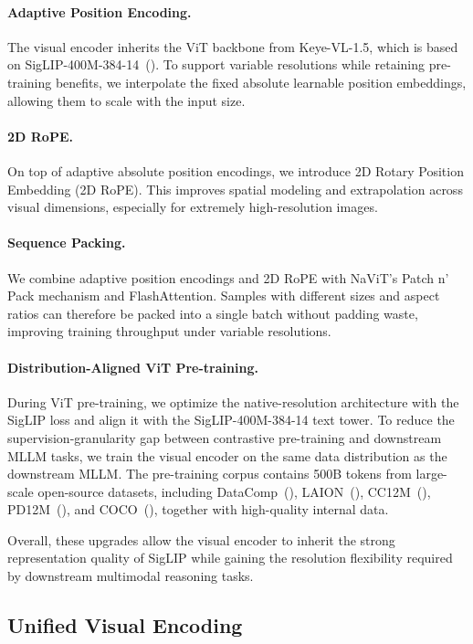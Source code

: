 \documentclass{llmxive}
\begin{document}
\paragraph{Adaptive Position Encoding.}
The visual encoder inherits the ViT backbone from Keye-VL-1.5, which is based on SigLIP-400M-384-14~(\cite{siglip}). To support variable resolutions while retaining pre-training benefits, we interpolate the fixed absolute learnable position embeddings, allowing them to scale with the input size.

\paragraph{2D RoPE.}
On top of adaptive absolute position encodings, we introduce 2D Rotary Position Embedding (2D RoPE). This improves spatial modeling and extrapolation across visual dimensions, especially for extremely high-resolution images.

\paragraph{Sequence Packing.}
We combine adaptive position encodings and 2D RoPE with NaViT's Patch n' Pack mechanism and FlashAttention. Samples with different sizes and aspect ratios can therefore be packed into a single batch without padding waste, improving training throughput under variable resolutions.

\paragraph{Distribution-Aligned ViT Pre-training.}
During ViT pre-training, we optimize the native-resolution architecture with the SigLIP loss and align it with the SigLIP-400M-384-14 text tower. To reduce the supervision-granularity gap between contrastive pre-training and downstream MLLM tasks, we train the visual encoder on the same data distribution as the downstream MLLM. The pre-training corpus contains 500B tokens from large-scale open-source datasets, including DataComp~(\cite{datacomp}), LAION~(\cite{laion}), CC12M~(\cite{cc12m}), PD12M~(\cite{pd12m}), and COCO~(\cite{coco}), together with high-quality internal data.

Overall, these upgrades allow the visual encoder to inherit the strong representation quality of SigLIP while gaining the resolution flexibility required by downstream multimodal reasoning tasks.

\subsection{Unified Visual Encoding}
\end{document}
